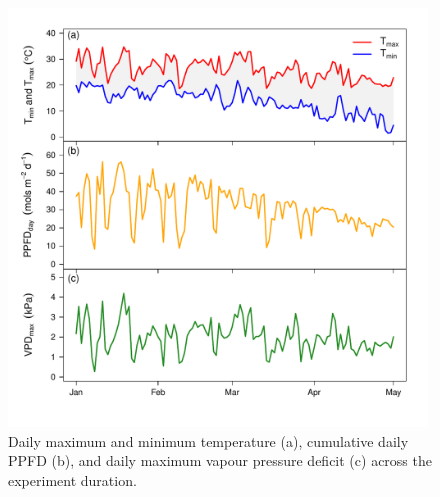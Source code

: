 \documentclass[a4paper]{article}\usepackage[]{graphicx}\usepackage[]{color}
\begin{document}
\begin{figure}[h!]
    \centering
    \includegraphics[width=0.99\textwidth]{airvars.pdf}
    \caption{Daily maximum and minimum temperature (a), cumulative daily PPFD (b), and daily maximum vapour pressure deficit (c) across the experiment duration.}
    \label{fig:figure1}
\end{figure}
\end{document}
